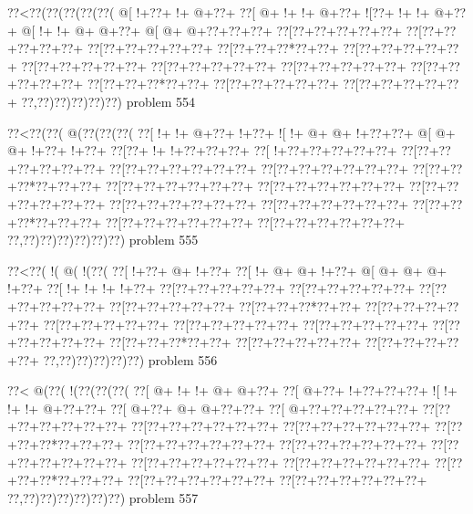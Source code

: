 \vbox{\vbox{\goo
\0??<\0??(\0??(\0??(\0??(\0??(
\- @[\- !+\0??+\- !+\- @+\0??+
\0??[\- @+\- !+\- !+\- @+\0??+
\- ![\0??+\- !+\- !+\- @+\0??+
\- @[\- !+\- !+\- @+\- @+\0??+
\- @[\- @+\- @+\0??+\0??+\0??+
\0??[\0??+\0??+\0??+\0??+\0??+
\0??[\0??+\0??+\0??+\0??+\0??+
\0??[\0??+\0??+\0??+\0??+\0??+
\0??[\0??+\0??+\0??*\0??+\0??+
\0??[\0??+\0??+\0??+\0??+\0??+
\0??[\0??+\0??+\0??+\0??+\0??+
\0??[\0??+\0??+\0??+\0??+\0??+
\0??[\0??+\0??+\0??+\0??+\0??+
\0??[\0??+\0??+\0??+\0??+\0??+
\0??[\0??+\0??+\0??*\0??+\0??+
\0??[\0??+\0??+\0??+\0??+\0??+
\0??[\0??+\0??+\0??+\0??+\0??+
\0??,\0??)\0??)\0??)\0??)\0??)
}
\hfil problem 554\hfil\break
}

\vbox{\vbox{\goo
\0??<\0??(\0??(\- @(\0??(\0??(\0??(
\0??[\- !+\- !+\- @+\0??+\- !+\0??+
\- ![\- !+\- @+\- @+\- !+\0??+\0??+
\- @[\- @+\- @+\- !+\0??+\- !+\0??+
\0??[\0??+\- !+\- !+\0??+\0??+\0??+
\0??[\- !+\0??+\0??+\0??+\0??+\0??+
\0??[\0??+\0??+\0??+\0??+\0??+\0??+
\0??[\0??+\0??+\0??+\0??+\0??+\0??+
\0??[\0??+\0??+\0??+\0??+\0??+\0??+
\0??[\0??+\0??+\0??*\0??+\0??+\0??+
\0??[\0??+\0??+\0??+\0??+\0??+\0??+
\0??[\0??+\0??+\0??+\0??+\0??+\0??+
\0??[\0??+\0??+\0??+\0??+\0??+\0??+
\0??[\0??+\0??+\0??+\0??+\0??+\0??+
\0??[\0??+\0??+\0??+\0??+\0??+\0??+
\0??[\0??+\0??+\0??*\0??+\0??+\0??+
\0??[\0??+\0??+\0??+\0??+\0??+\0??+
\0??[\0??+\0??+\0??+\0??+\0??+\0??+
\0??,\0??)\0??)\0??)\0??)\0??)\0??)
}
\hfil problem 555\hfil\break
}

\vbox{\vbox{\goo
\0??<\0??(\- !(\- @(\- !(\0??(
\0??[\- !+\0??+\- @+\- !+\0??+
\0??[\- !+\- @+\- @+\- !+\0??+
\- @[\- @+\- @+\- @+\- !+\0??+
\0??[\- !+\- !+\- !+\- !+\0??+
\0??[\0??+\0??+\0??+\0??+\0??+
\0??[\0??+\0??+\0??+\0??+\0??+
\0??[\0??+\0??+\0??+\0??+\0??+
\0??[\0??+\0??+\0??+\0??+\0??+
\0??[\0??+\0??+\0??*\0??+\0??+
\0??[\0??+\0??+\0??+\0??+\0??+
\0??[\0??+\0??+\0??+\0??+\0??+
\0??[\0??+\0??+\0??+\0??+\0??+
\0??[\0??+\0??+\0??+\0??+\0??+
\0??[\0??+\0??+\0??+\0??+\0??+
\0??[\0??+\0??+\0??*\0??+\0??+
\0??[\0??+\0??+\0??+\0??+\0??+
\0??[\0??+\0??+\0??+\0??+\0??+
\0??,\0??)\0??)\0??)\0??)\0??)
}
\hfil problem 556\hfil\break
}

\vbox{\vbox{\goo
\0??<\- @(\0??(\- !(\0??(\0??(\0??(
\0??[\- @+\- !+\- !+\- @+\- @+\0??+
\0??[\- @+\0??+\- !+\0??+\0??+\0??+
\- ![\- !+\- !+\- !+\- @+\0??+\0??+
\0??[\- @+\0??+\- @+\- @+\0??+\0??+
\0??[\- @+\0??+\0??+\0??+\0??+\0??+
\0??[\0??+\0??+\0??+\0??+\0??+\0??+
\0??[\0??+\0??+\0??+\0??+\0??+\0??+
\0??[\0??+\0??+\0??+\0??+\0??+\0??+
\0??[\0??+\0??+\0??*\0??+\0??+\0??+
\0??[\0??+\0??+\0??+\0??+\0??+\0??+
\0??[\0??+\0??+\0??+\0??+\0??+\0??+
\0??[\0??+\0??+\0??+\0??+\0??+\0??+
\0??[\0??+\0??+\0??+\0??+\0??+\0??+
\0??[\0??+\0??+\0??+\0??+\0??+\0??+
\0??[\0??+\0??+\0??*\0??+\0??+\0??+
\0??[\0??+\0??+\0??+\0??+\0??+\0??+
\0??[\0??+\0??+\0??+\0??+\0??+\0??+
\0??,\0??)\0??)\0??)\0??)\0??)\0??)
}
\hfil problem 557\hfil\break
}


